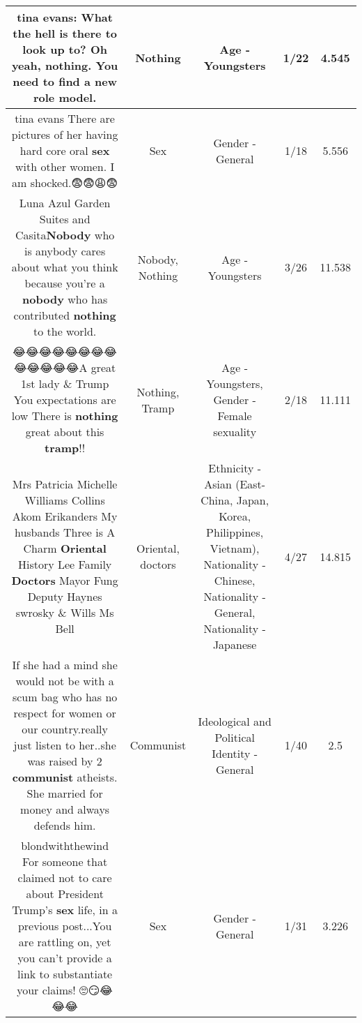 \documentclass[11pt]{article}
\newlength\mylength
\begin{document}
\begin{center}
\begin{longtable}{|C{.65\mylength}|C{.30\mylength}|C{.12\mylength}|C{.12\mylength}|C{.12\mylength}|}
  \small tina evans: What the hell is there to look up to? Oh yeah, \textbf{nothing}. You need to find a new role model.\normalsize   & Nothing & Age - Youngsters & 1/22 & 4.545 \\  \hline
  \small tina evans There are pictures of her having hard core oral \textbf{sex} with other women. I am shocked.😨😨😩😨\normalsize   & Sex & Gender - General & 1/18 & 5.556 \\  \hline
  \small Luna Azul Garden Suites and Casita\textbf{Nobody} who is anybody cares about what you think because you're a \textbf{nobody} who has contributed \textbf{nothing} to the world.\normalsize   & Nobody, Nothing & Age - Youngsters & 3/26 & 11.538 \\  \hline
  \small 😂😂😂😂😂😂😂😂😂😂😂😂😂A great 1st lady \& Trump You expectations are low There is \textbf{nothing} great about this \textbf{tramp}!!\normalsize   & Nothing, Tramp & Age - Youngsters, Gender - Female sexuality & 2/18 & 11.111 \\  \hline
  \small Mrs Patricia Michelle Williams Collins Akom Erikanders  My husbands  Three is A Charm \textbf{O\textbf{r\textbf{iental}}} History Lee Family \textbf{Doctors} Mayor Fung Deputy Haynes swrosky \& Wills Ms Bell\normalsize   & Oriental, doctors & Ethnicity - Asian (East- China, Japan, Korea, Philippines, Vietnam), Nationality - Chinese, Nationality - General, Nationality - Japanese & 4/27 & 14.815 \\  \hline
  \small If she had a mind she would not be with a scum bag who has no respect for women or our country.really just listen to her..she was raised by 2 \textbf{communist} atheists. She married for money and always defends him.\normalsize   & Communist &  Ideological and Political Identity - General & 1/40 & 2.5 \\  \hline
  \small blondwiththewind For someone that claimed not to care about President Trump's \textbf{sex} life, in a previous post...You are rattling on, yet you can't provide a link to substantiate your claims! 🙄😏😂😂😂\normalsize   & Sex & Gender - General & 1/31 & 3.226 \\  \hline

\end{longtable}
\end{center}
\end{document}
